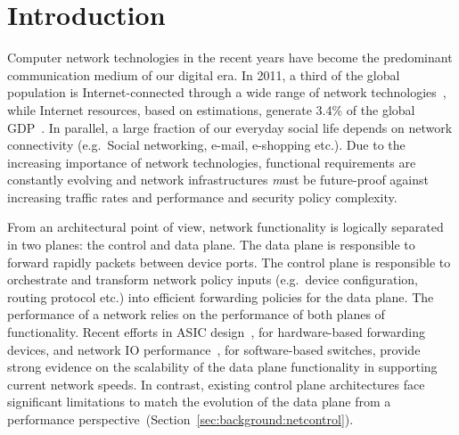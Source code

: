\chapter{Introduction} \label{s:introduction:introduction}

Computer network technologies in the recent years have become the predominant
communication medium of our digital era.  In 2011, a third of the global
population is Internet-connected through a wide range of network
technologies~\cite{itufacts2011}, while Internet resources, based on
estimations, generate 3.4\% of the global GDP~\cite{duRausas:2011un}. In
parallel, a large fraction of our everyday social life depends on network
connectivity (e.g.~Social networking, e-mail, e-shopping etc.). Due to the
increasing importance of network technologies, functional requirements are
constantly evolving and network infrastructures {\emph must} be future-proof
against increasing traffic rates and performance and security policy complexity.

From an architectural point of view, network functionality is logically
separated in two planes: the control and data plane. The data plane is
responsible to forward rapidly packets between device ports.  The control plane
is responsible to orchestrate and transform network policy inputs (e.g.~device
configuration, routing protocol etc.) into efficient forwarding policies for the
data plane. The performance of a network relies on the performance of both
planes of functionality. Recent efforts in ASIC design~\cite{covington13}, for
hardware-based forwarding devices, and network IO
performance~\cite{routebricks,rizzo12,Han10}, for software-based switches,
provide strong evidence on the scalability of the data plane functionality in
supporting current network speeds.  In contrast, existing control plane
architectures face significant limitations to match the evolution of the data
plane from a performance perspective~(Section~\ref{sec:background:netcontrol}). 

